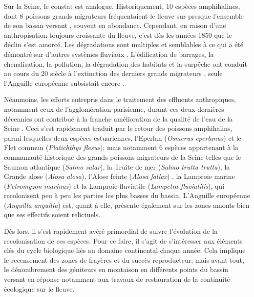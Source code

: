 \documentclass[11pt,titlepage,twoside]{report}\usepackage[]{graphicx}\usepackage[table]{xcolor}
\begin{document}
Sur la Seine, le constat est analogue. Historiquement, 10 espèces amphihalines, dont 8 poissons grands migrateurs
fréquentaient le fleuve sur presque l'ensemble de son bassin versant \citep{moreau_histoire_1881,moreau_les_1898,
poplin_peuplement_1952,euzenat_migren_1992,rochard_identification_2007}, souvent en abondance. Cependant,
en raison d'une anthropisation toujours croissante du fleuve, c'est dès les années 1850 que le déclin s'est amorcé.
Les dégradations sont multiples et semblables à ce qui a été démontré sur d'autres systèmes fluviaux
\citep{nehlsen_pacific_2011,mcdowall_different_1999,lichatowich_depletion_1999,mckinnell_spatial_1999,
limburg_dramatic_2009}. L'édification de barrages, la chenalisation, la pollution, la dégradation des habitats et la surpêche ont conduit au cours du 20 siècle à l'extinction des derniers grands migrateurs
\citep{euzenat_migren_1992,belliard_peuplement_1994,mouchel_bassin_1998,boet_multiple_1999,rochard_identification_2007},
seule l'Anguille européenne subsistait encore \citep{boet_multiple_1999,rochard_identification_2007}.

Néanmoins, les efforts entrepris dans le traitement des effluents anthropiques, notamment ceux de l'agglomération parisienne, durant ces deux dernières décennies ont contribué à la franche amélioration de la qualité de l'eau de la Seine \citep{billen_programme_1999,belliard_return_2009,
gousailles_limpact_2009}. Ceci s'est rapidement traduit par le retour des poissons amphihalins, parmi lesquelles deux espèces estuariennes, l'Eperlan (\textit{Osmerus eperlanus}) \citep{pomfret_spatial_1991} et le Flet commun
(\textit{Platichthys flesus}); mais notamment 6 espèces appartenant à la communauté historique des grands poissons
migrateurs de la Seine \citep{rochard_identification_2009} telles que le Saumon atlantique (\textit{Salmo salar}),
la Truite de mer (\textit{Salmo trutta trutta}), la Grande alose (\textit{Alosa alosa}), l'Alose feinte
(\textit{Alosa fallax}) \citep{duhamel_peuplement_2004}, la Lamproie marine (\textit{Petromyzon marinus}) et la
Lamproie fluviatile (\textit{Lampetra fluviatilis}), qui recolonisent peu à peu les parties les plus basses du bassin. L'Anguille européenne (\textit{Anguilla anguilla}) est, quant à elle, présente également sur les zones amonts bien que ses effectifs soient relictuels.

Dès lors, il s'est rapidement avéré primordial de suivre l'évolution de la recolonisation de ces espèces. Pour ce faire, il s'agit de s'intéresser aux éléments clés du cycle biologique liés au domaine continental chaque année. Cela implique
le recensement des zones de frayères et du succès reproducteur; mais avant tout, le dénombrement des géniteurs en montaison en différents points du bassin versant en réponse notamment aux travaux de restauration de la continuité écologique sur le fleuve.
\end{document}

